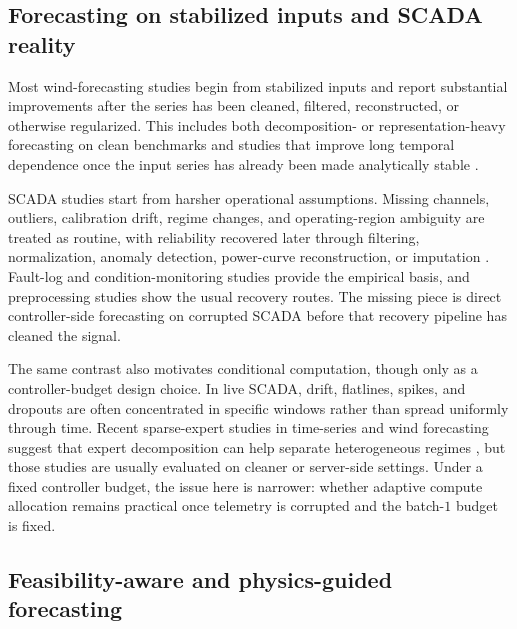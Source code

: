 \documentclass[review,1p,times]{elsarticle}
\begin{document}
\subsection{Forecasting on stabilized inputs and SCADA reality}
\label{subsec:related_scada}\label{subsec:related_nonstationary}

Most wind-forecasting studies begin from stabilized inputs and report substantial improvements after the series has been cleaned, filtered, reconstructed, or otherwise regularized. This includes both decomposition- or representation-heavy forecasting on clean benchmarks and studies that improve long temporal dependence once the input series has already been made analytically stable \citep{verdone2025review,zhang2021windreview,duan2025robust,zhu2025realtime,ma2022gcnwind,gao2025mmgpt,wu2024stellm,liu2019dataprocessing,wang2021datacleaning}.

SCADA studies start from harsher operational assumptions. Missing channels, outliers, calibration drift, regime changes, and operating-region ambiguity are treated as routine, with reliability recovered later through filtering, normalization, anomaly detection, power-curve reconstruction, or imputation \citep{maldonadocorrea2020slr,sheng2025annreview,yang2013condition,bangalore2018earlyfault,letzgus2020,renstrom2020autoencoder,vervlimmeren2025scalable,martincalzada2025optimized,tawn2020missingdata,wen2024fcsmissing}. Fault-log and condition-monitoring studies provide the empirical basis, and preprocessing studies show the usual recovery routes. The missing piece is direct controller-side forecasting on corrupted SCADA before that recovery pipeline has cleaned the signal.

The same contrast also motivates conditional computation, though only as a controller-budget design choice. In live SCADA, drift, flatlines, spikes, and dropouts are often concentrated in specific windows rather than spread uniformly through time. Recent sparse-expert studies in time-series and wind forecasting suggest that expert decomposition can help separate heterogeneous regimes \citep{zhang2025shapmoe,liu2024moiraimoe,shi2025timemoe}, but those studies are usually evaluated on cleaner or server-side settings. Under a fixed controller budget, the issue here is narrower: whether adaptive compute allocation remains practical once telemetry is corrupted and the batch-$1$ budget is fixed.

\subsection{Feasibility-aware and physics-guided forecasting}
\label{subsec:related_physics}
\end{document}
